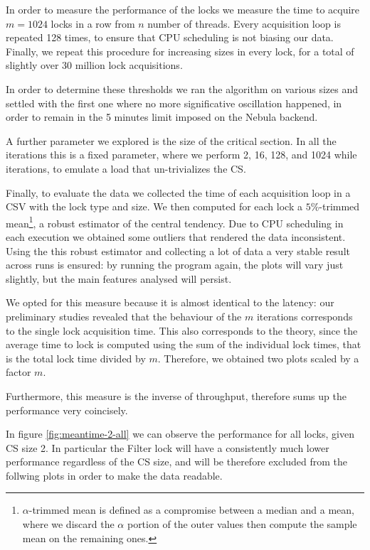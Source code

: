 In order to measure the performance of the locks we measure the time to acquire
$m = 1024$ locks in a row from $n$ number of threads.
Every acquisition loop is repeated 128 times, to ensure that CPU scheduling is not
biasing our data.
Finally, we repeat this procedure for increasing sizes in every lock, for a total
of slightly over 30 million lock acquisitions.

In order to determine these thresholds we ran the algorithm on various sizes and
settled with the first one where no more significative oscillation happened,
in order to remain in the 5 minutes limit imposed on the Nebula backend.

A further parameter we explored is the size of the critical section.
In all the iterations this is a fixed parameter, where we perform 2, 16, 128,
and 1024 while iterations, to emulate a load that un-trivializes the CS.

Finally, to evaluate the data we collected the time of each acquisition loop in
a CSV with the lock type and size.
We then computed for each lock a $5\%$-trimmed mean\footnote{$\alpha$-trimmed
mean is defined as a compromise between a median and a mean, where we discard
the $\alpha$ portion of the outer values then compute the sample mean on the
remaining ones.}, a robust estimator of the
central tendency.
Due to CPU scheduling in each execution we obtained some outliers that rendered
the data inconsistent.
Using the this robust estimator and collecting a lot of data a very stable
result across runs is ensured: by running the program again, the plots will vary
just slightly, but the main features analysed will persist.

We opted for this measure because it is almost identical to the latency: our
preliminary studies revealed that the behaviour of the $m$ iterations corresponds
to the single lock acquisition time.
This also corresponds to the theory, since the average time to lock is computed
using the sum of the individual lock times, that is the total lock time divided
by $m$.
Therefore, we obtained two plots scaled by a factor $m$.

Furthermore, this measure is the inverse of throughput, therefore sums up the
performance very coincisely.

In figure \ref{fig:meantime-2-all} we can observe the performance for all locks,
given CS size 2.
In particular the Filter lock will have a consistently much lower performance
regardless of the CS size, and will be therefore excluded from the follwing
plots in order to make the data readable.


